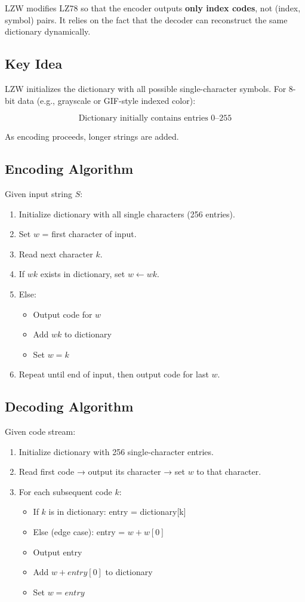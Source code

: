 \documentclass{AnantDocumentation}
\begin{document}
LZW modifies LZ78 so that the encoder outputs \textbf{only index codes}, not (index, symbol) pairs.  
It relies on the fact that the decoder can reconstruct the same dictionary dynamically.

\subsection{Key Idea}

LZW initializes the dictionary with all possible single-character symbols.  
For 8-bit data (e.g., grayscale or GIF-style indexed color):

\[
\text{Dictionary initially contains entries 0–255}
\]

As encoding proceeds, longer strings are added.

\subsection{Encoding Algorithm}

Given input string \(S\):

\begin{enumerate}
\item Initialize dictionary with all single characters (256 entries).
\item Set \(w\) = first character of input.
\item Read next character \(k\).
\item If \(wk\) exists in dictionary, set \(w \leftarrow wk\).
\item Else:
	\begin{itemize}
	\item Output code for \(w\)
	\item Add \(wk\) to dictionary
	\item Set \(w = k\)
	\end{itemize}
\item Repeat until end of input, then output code for last \(w\).
\end{enumerate}

\subsection{Decoding Algorithm}

Given code stream:

\begin{enumerate}
\item Initialize dictionary with 256 single-character entries.
\item Read first code → output its character → set \(w\) to that character.
\item For each subsequent code \(k\):
	\begin{itemize}
	\item If \(k\) is in dictionary: entry = dictionary[k]
	\item Else (edge case): entry = \(w + w[0]\)
	\item Output entry
	\item Add \(w + entry[0]\) to dictionary
	\item Set \(w = entry\)
	\end{itemize}
\end{enumerate}
\end{document}
